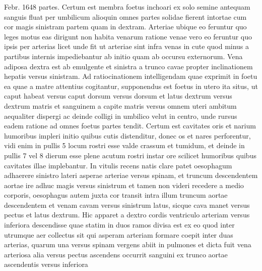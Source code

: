 \pstart%
\noindent%
Febr. 1648 partes.
Certum
%
est membra foetus inchoari ex solo semine antequam sanguis fluat per umbilicum alioquin omnes partes solidae fierent intortae cum cor magis
sinistram partem quam in dextram.
\pend%
\pstart%
Arteriae ubique eo feruntur quo leges motus eas dirigunt non habita venarum ratione venae vero eo feruntur quo ipsis per arterias licet unde fit ut arteriae sint infra venas in cute quod minus a partibus internis impediebantur ab initio quam ab occursu externorum.
\pend%
\pstart%
Vena adiposa dextra est ab emulgente et sinistra a trunco cavae propter inclinationem hepatis versus sinistram.
\pend%
\pstart%
Ad ratiocinationem intelligendam quae exprimit in foetu ea quae a matre attentius cogitantur, supponendus est foetus in utero ita situs, ut caput habeat versus caput dorsum versus dorsum et latus dextrum versus dextrum matris et sanguinem a capite matris versus omnem uteri ambitum aequaliter dispergi ac deinde colligi in umbilico velut in centro, unde rursus eadem ratione ad omnes foetus partes tendit.%
%
\pend%
\pstart%
Certum est cavitates oris et narium humoribus impleri initio quibus cutis distenditur, donec os et nares perforentur, vidi enim in pullis 5
locum rostri esse valde crassum et tumidum, et deinde in pullis 7 vel 8 dierum esse plene acutum rostri instar ore scilicet
humoribus quibus cavitates illae implebantur.
\pend%
\pstart%
In vitulis recens natis clare patet oesophagum adhaerere sinistro lateri asperae arteriae versus spinam, et truncum descendentem aortae ire adhuc magis versus sinistrum et tamen non videri recedere a medio corporis, oesophagus autem juxta cor transit intra illum truncum aortae descendentem et venam cavam versus sinistrum latus, sicque cava manet versus pectus et latus dextrum. Hic apparet a dextro cordis ventriculo arteriam versus inferiora descendisse quae statim in duos ramos divisa est ex eo quod inter utrumque aer collectus sit qui asperam arteriam formare coepit inter duas arterias, quarum una versus spinam vergens abiit in pulmones et dicta fuit vena arteriosa alia versus pectus ascendens occurrit sanguini ex trunco aortae ascendentis versus inferiora
